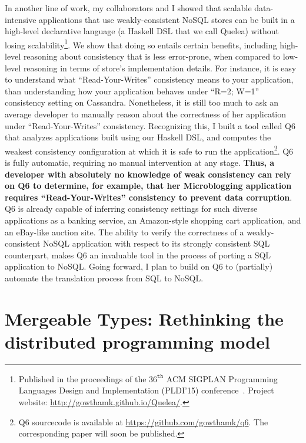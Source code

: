 In another line of work, my collaborators and I showed that scalable
data-intensive applications that use weakly-consistent NoSQL stores
can be built in a high-level declarative language (a Haskell DSL that
we call {\sc Quelea}) without losing scalability\footnote{Published in
the proceedings of the $36^{\texttt{th}}$ ACM SIGPLAN Programming
Languages Design and Implementation (PLDI'15)
conference~\cite{pldi15}. Project website:
\url{http://gowthamk.github.io/Quelea/}.}. We show that doing so
entails certain benefits, including high-level reasoning about
consistency that is less error-prone, when compared to low-level
reasoning in terms of store's implementation details. For instance, it
is easy to understand what ``Read-Your-Writes'' consistency means to
your application, than understanding how your application behaves
under ``R=2; W=1'' consistency setting on Cassandra. Nonetheless, it
is still too much to ask an average developer to manually reason about
the correctness of her application under ``Read-Your-Writes''
consistency. Recognizing this, I built a tool called {\sc Q6} that
analyzes applications built using our Haskell DSL, and computes the
weakest consistency configuration at which it is safe to run the
application\footnote{{\sc Q6} sourcecode is available at
\url{https://github.com/gowthamk/q6}. The corresponding paper will
soon be published.}.  {\sc Q6} is fully automatic, requiring no manual
intervention at any stage.  {\bf Thus, a developer with absolutely no
knowledge of weak consistency can rely on {\sc Q6} to determine, for
example, that her Microblogging application requires
``Read-Your-Writes'' consistency to prevent data corruption}. {\sc Q6}
is already capable of inferring consistency settings for such diverse
applications as a banking service, an Amazon-style shopping cart
application, and an eBay-like auction site. The ability to verify the
correctness of a weakly-consistent NoSQL application with respect to
its strongly consistent SQL counterpart, makes {\sc Q6} an invaluable
tool in the process of porting a SQL application to NoSQL.  Going
forward, I plan to build on {\sc Q6} to (partially) automate the
translation process from SQL to NoSQL.

\section*{Mergeable Types: Rethinking the distributed programming model}

